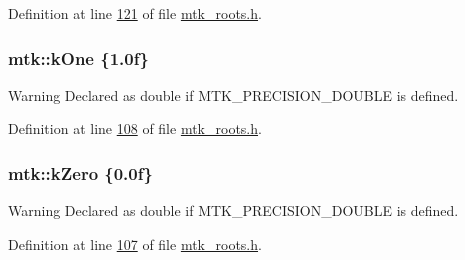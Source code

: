 Definition at line \hyperlink{mtk__roots_8h_source_l00121}{121} of file \hyperlink{mtk__roots_8h_source}{mtk\+\_\+roots.\+h}.

\hypertarget{group__c01-roots_ga26407c24d43b6b95480943340d285c71}{
\subsubsection[{k\+One}]{\setlength{\rightskip}{0pt plus 5cm}mtk\+::k\+One \{1.\+0f\}}}\label{group__c01-roots_ga26407c24d43b6b95480943340d285c71}
\begin{DoxyWarning}{Warning}
Declared as double if M\+T\+K\+\_\+\+P\+R\+E\+C\+I\+S\+I\+O\+N\+\_\+\+D\+O\+U\+B\+L\+E is defined. 
\end{DoxyWarning}


Definition at line \hyperlink{mtk__roots_8h_source_l00108}{108} of file \hyperlink{mtk__roots_8h_source}{mtk\+\_\+roots.\+h}.

\hypertarget{group__c01-roots_ga59a451a5fae30d59649bcda274fea271}{
\subsubsection[{k\+Zero}]{\setlength{\rightskip}{0pt plus 5cm}mtk\+::k\+Zero \{0.\+0f\}}}\label{group__c01-roots_ga59a451a5fae30d59649bcda274fea271}
\begin{DoxyWarning}{Warning}
Declared as double if M\+T\+K\+\_\+\+P\+R\+E\+C\+I\+S\+I\+O\+N\+\_\+\+D\+O\+U\+B\+L\+E is defined. 
\end{DoxyWarning}


Definition at line \hyperlink{mtk__roots_8h_source_l00107}{107} of file \hyperlink{mtk__roots_8h_source}{mtk\+\_\+roots.\+h}.

